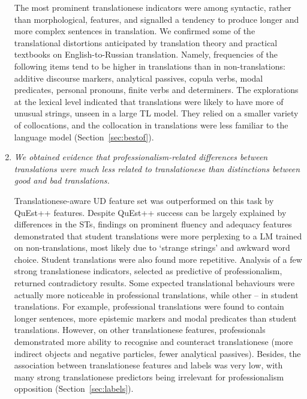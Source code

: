 \begin{enumerate}
	The most prominent translationese indicators were among syntactic, rather than morphological, features, and signalled a tendency to produce longer and more complex sentences in translation. We confirmed some of the translational distortions anticipated by translation theory and practical textbooks on English-to-Russian translation. Namely, frequencies of the following items tend to be higher in translations than in non-translations: additive discourse markers, analytical passives, copula verbs, modal predicates, personal pronouns, finite verbs and determiners.
	The explorations at the lexical level indicated that translations were likely to have more of unusual strings, unseen in a large TL model. They relied on a smaller variety of collocations, and the collocation in translations were less familiar to the language model (Section~\ref{sec:bestof}). %
	
	\item \textit{We obtained evidence that professionalism-related differences between translations were much less related to translationese than distinctions between \textit{good} and \textit{bad} translations.} %
	
	Translationese-aware UD feature set was outperformed on this task by QuEst++ features. Despite QuEst++ success can be largely explained by differences in the STs, findings on prominent fluency and adequacy features demonstrated that student translations were more perplexing to a LM trained on non-translations, most likely due to `strange strings' and awkward word choice. Student translations were also found more repetitive. Analysis of a few strong translationese indicators, selected as predictive of professionalism, returned contradictory results. Some expected translational behaviours were actually more noticeable in professional translations, while other -- in student translations. For example, professional translations were found to contain longer sentences, more epistemic markers and modal predicates than student translations. However, on other translationese features, professionals demonstrated more ability to recognise and counteract translationese (more indirect objects and negative particles, fewer analytical passives).
	Besides, the association between translationese features and labels was very low, with many strong translationese predictors being irrelevant for professionalism opposition (Section~\ref{sec:labels}).
	

\end{enumerate}
